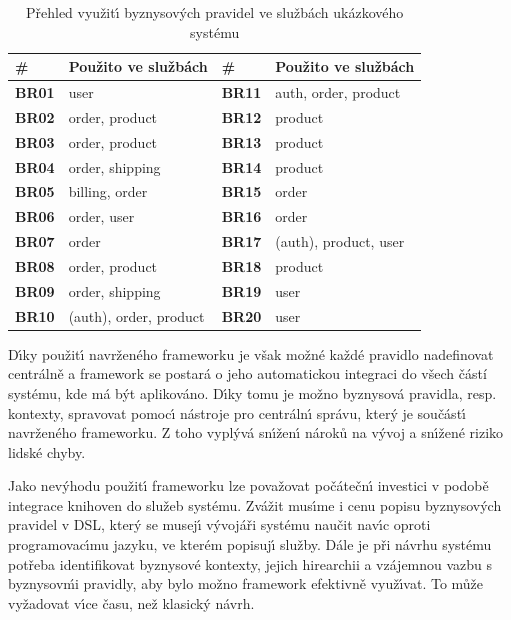 \begin{table}
    \centering
    \begin{tabularx}{\textwidth}{ l X | l X }
        \hline
        \textbf{\#} & \textbf{Použito ve službách} & \textbf{\#} & \textbf{Použito ve službách} \\ \hline \hline
        \textbf{BR01} & user & \textbf{BR11} & auth, order, product \\
        \textbf{BR02} & order, product & \textbf{BR12} & product \\
        \textbf{BR03} & order, product & \textbf{BR13} & product \\
        \textbf{BR04} & order, shipping & \textbf{BR14} & product \\
        \textbf{BR05} & billing, order & \textbf{BR15} & order \\
        \textbf{BR06} & order, user & \textbf{BR16} & order \\
        \textbf{BR07} & order & \textbf{BR17} & (auth), product, user \\
        \textbf{BR08} & order, product & \textbf{BR18} & product \\
        \textbf{BR09} & order, shipping & \textbf{BR19} & user \\
        \textbf{BR10} & (auth), order, product & \textbf{BR20} & user \\
        \hline
    \end{tabularx}
    \caption{Přehled využit\'{\i} byznysov\'ych pravidel ve službách ukázkového systému}
    \label{tbl:duplication}
\end{table}

D\'{\i}ky použit\'{\i} navrženého frameworku je však možné každé pravidlo nadefinovat centrálně
a framework se postará o jeho automatickou integraci do všech částí systému, kde má být aplikováno.
D\'{\i}ky tomu je možno byznysová pravidla, resp. kontexty, spravovat pomoc\'{\i} nástroje pro
centráln\'{\i} správu, kter\'y je součást\'{\i} navrženého frameworku. Z toho vypl\'yvá
sn\'{\i}žen\'{\i} nároků na v\'yvoj a sn\'{\i}žené riziko lidské chyby.

Jako nev\'yhodu použit\'{\i} frameworku lze považovat počátečn\'{\i} investici v
podobě integrace knihoven do služeb systému. Zvážit mus\'{\i}me i cenu popisu byznysov\'ych pravidel
v \gls{DSL}, kter\'y se musej\'{\i} v\'yvojáři systému naučit nav\'{\i}c oproti programovac\'{\i}mu jazyku,
ve kterém popisuj\'{\i} služby. Dále je při návrhu systému potřeba identifikovat byznysové kontexty, jejich
hirearchii a vzájemnou vazbu s byznysov\'mi pravidly, aby bylo možno framework efektivně využ\'{\i}vat.
To může vyžadovat v\'{\i}ce času, než klasick\'y návrh.

